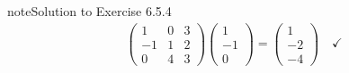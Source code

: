 \documentclass[letterpaper,10pt,english]{jupyterBook}
\begin{document}
\begin{sphinxadmonition}{note}{Solution to Exercise 6.5.4}
\begin{equation*}
\begin{split}
\begin{pmatrix} 1 & 0 & 3 \\ -1 & 1 & 2 \\ 0 & 4 & 3 \end{pmatrix}
\begin{pmatrix}1 \\ -1 \\ 0 \end{pmatrix} = 
\begin{pmatrix} 1 \\ -2 \\ - 4 \end{pmatrix} \quad \checkmark \end{split}
\end{equation*}\end{sphinxadmonition}
 \label{_pages/A6_Linear_transformations_exercises_solutions:_pages/A6_Linear_transformations_exercises_solutions-solution-4}
\end{document}
